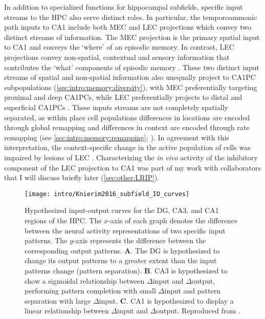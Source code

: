 In addition to specialized functions for hippocampal subfields, specific input streams to the \ac{HPC} also serve distinct roles.
In particular, the temporoammonic path inputs to CA1 include both \ac{MEC} and \ac{LEC} projections which convey two distinct streams of information.
The \ac{MEC} projection is the primary spatial input to CA1 and conveys the `where' of an episodic memory.
In contrast, \ac{LEC} projections convey non-spatial, contextual and sensory information that contributes the `what' components of episodic memory \citep{Hargreaves2005, Dickerson2010, Eichenbaum2012}.
These two distinct input streams of spatial and non-spatial information also unequally project to CA1PC subpopulations (\autoref{sec:intro:memory:diversity}), with \ac{MEC} preferentially targeting proximal and deep \acp{CA1PC}, while \ac{LEC} preferentially projects to distal and superficial \acp{CA1PC} \citep{Masurkar2017}.
These inputs streams are not completely spatially separated, as within place cell populations differences in locations are encoded through global remapping and differences in context are encoded through rate remapping (see \autoref{sec:intro:memory:remapping}; \citealp{Leutgeb2005a}).
In agreement with this interpretation, the context-specific change in the active population of cells was impaired by lesions of \ac{LEC} \citep{Lu2013}.
Characterizing the \emph{in vivo} activity of the inhibitory component of the \ac{LEC} projection to CA1 was part of my work with collaborators that I will discuss briefly later (\autoref{sec:other:LRIP}).

\begin{figure}
	\centering
	\texttt{[image: intro/Knierim2016\_subfield\_IO\_curves]}
	\caption[Hypothesized input-output curves for the DG, CA3, and CA1 regions of the \acl{HPC}]{Hypothesized input-output curves for the DG, CA3, and CA1 regions of the \acl{HPC}. The $x$-axis of each graph denotes the difference between the neural activity representations of two specific input patterns. The $y$-axis represents the difference between the corresponding output patterns.
	\textbf{A}. The DG is hypothesized to change its output patterns to a greater extent than the input patterns change (pattern separation).
	\textbf{B}. CA3 is hypothesized to show a sigmoidal relationship between $\Delta$input and $\Delta$output, performing pattern completion with small $\Delta$input and pattern separation with large $\Delta$input.
	\textbf{C}. CA1 is hypothesized to display a linear relationship between $\Delta$input and $\Delta$output.
	Reproduced from \citet{Knierim2016}.}
	\label{fig:intro:memory:subfield_IO}
\end{figure}

